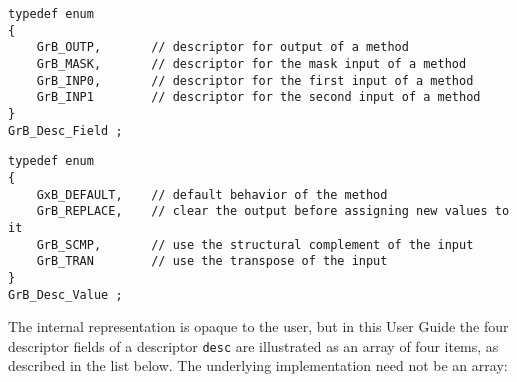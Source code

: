 \documentclass[12pt]{article}
\begin{document}
\begin{mdframed}[userdefinedwidth=6in]
{\footnotesize
\begin{verbatim}
typedef enum
{
    GrB_OUTP,       // descriptor for output of a method
    GrB_MASK,       // descriptor for the mask input of a method
    GrB_INP0,       // descriptor for the first input of a method
    GrB_INP1        // descriptor for the second input of a method
}
GrB_Desc_Field ;
\end{verbatim} } \end{mdframed}

\begin{mdframed}[userdefinedwidth=6in]
{\footnotesize
\begin{verbatim}
typedef enum
{
    GxB_DEFAULT,    // default behavior of the method
    GrB_REPLACE,    // clear the output before assigning new values to it
    GrB_SCMP,       // use the structural complement of the input
    GrB_TRAN        // use the transpose of the input
}
GrB_Desc_Value ;
\end{verbatim} } \end{mdframed}

The internal representation is opaque to the user, but in this User Guide the
four descriptor fields of a descriptor \verb'desc' are illustrated as an array
of four items, as described in the list below.  The underlying implementation
need not be an array:
\end{document}
